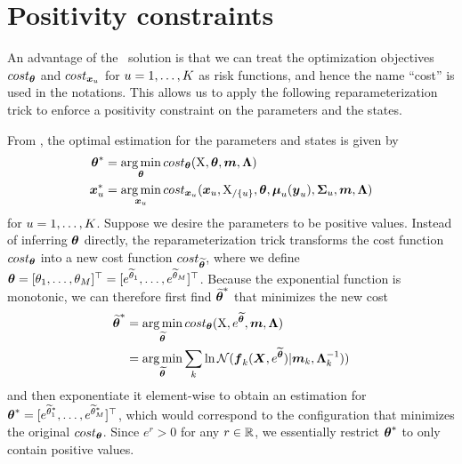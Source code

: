 \section{Positivity constraints}
\label{sec-laplace-positivity}

An advantage of the \algolpmf\ solution is that we can treat the optimization objectives $cost_{\boldsymbol{\theta}}$ and $cost_{\boldsymbol{x}_{u}}$ for $u = 1,\dots,K$ as risk functions, and hence the name ``cost'' is used in the notations.
This allows us to apply the following reparameterization trick to enforce a positivity constraint on the parameters and the states.

From , the optimal estimation for the parameters and states is given by
\begin{align}
    \boldsymbol{\theta}^*
    & =
    \operatorname*{arg\,min}_{\boldsymbol{\theta}}{
        cost_{\boldsymbol{\theta}}(\mathrm{X},\boldsymbol{\theta},\boldsymbol{m},\boldsymbol{\Lambda})
    }
    \label{eq-laplace-theta-cost-short}
    \\
    \boldsymbol{x}_{u}^*
    & =     
    \operatorname*{arg\,min}_{\boldsymbol{x}_{u}}{
        cost_{\boldsymbol{x}_{u}}(\boldsymbol{x}_{u},\mathrm{X}_{/\{u\}},\boldsymbol{\theta},\boldsymbol{\mu}_{u}(\boldsymbol{y}_{u}),\boldsymbol{\Sigma}_{u},\boldsymbol{m},\boldsymbol{\Lambda})
    }
    \label{eq-laplace-xu-cost}    
\end{align}
for $u = 1,\dots,K$.
Suppose we desire the parameters to be positive values.
Instead of inferring $\boldsymbol{\theta}$ directly, the reparameterization trick transforms the cost function $cost_{\boldsymbol{\theta}}$ into a new cost function $cost_{\boldsymbol{\widetilde{\theta}}}$, where we define $\boldsymbol{\theta} = [\theta_{1},\dots,\theta_{M}]^\top = [e^{\widetilde{\theta}_{1}},\dots,e^{\widetilde{\theta}_{M}}]^\top$. 
Because the exponential function is monotonic, we can therefore first find $\boldsymbol{\widetilde{\theta}}^*$ that minimizes the new cost
\begin{align}
    \boldsymbol{\widetilde{\theta}}^* 
    & = 
    \operatorname*{arg\,min}_{\boldsymbol{\widetilde{\theta}}}{
        cost_{\boldsymbol{\theta}}(\mathrm{X},e^{\boldsymbol{\widetilde{\theta}}},\boldsymbol{m},\boldsymbol{\Lambda})
    }
    \nonumber
    \\
    & = 
    \operatorname*{arg\,min}_{\boldsymbol{\widetilde{\theta}}}{
        \sum_k{
            \ln{
                \mathcal{N}(\boldsymbol{f}_k(\boldsymbol{X}, e^{\widetilde{\boldsymbol{\theta}}}) \vert\boldsymbol{m}_{k},\boldsymbol{\Lambda}_{k}^{-1}))}}}    
\end{align}
and then exponentiate it element-wise to obtain an estimation for $\boldsymbol{\theta}^* = [e^{\widetilde{\theta}_{1}^*},\dots,e^{\widetilde{\theta}_{M}^*}]^\top$, which would correspond to the configuration that minimizes the original $cost_{\boldsymbol{\theta}}$.
Since $e^r > 0$ for any $r \in \mathbb{R}$, we essentially restrict $\boldsymbol{\theta}^*$ to only contain positive values.

